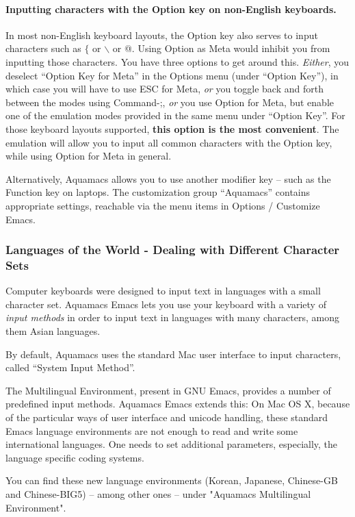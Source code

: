 \documentclass[11pt,letterpaper]{article}
\begin{document}
\paragraph{Inputting characters with the Option key on non-English
  keyboards.} In most non-English keyboard layouts, the Option key
also serves to input characters such as $\{$ or $\backslash$ or
@. Using Option as Meta would inhibit you from inputting those
characters. You have three options to get around this. \emph{Either},
you deselect ``Option Key for Meta'' in the Options menu (under
``Option Key''), in which case you will have to use ESC for Meta,
\emph{or} you toggle back and forth between the modes using Command-;,
\emph{or} you use Option for Meta, but enable one of the emulation
modes provided in the same menu under ``Option Key''.  For those keyboard layouts supported, \textbf{this option is the most convenient}.  The emulation will allow
you to input all common characters with the Option key, while using Option for Meta in general. 

Alternatively, Aquamacs allows you to use another modifier key -- such
as the Function key on laptops. The customization group ``Aquamacs''
contains appropriate settings, reachable via the menu items in Options / Customize Emacs.

\subsubsection{Languages of the World - Dealing with Different Character Sets}

Computer keyboards were designed to input text in languages with a
small character set.  Aquamacs Emacs lets you use your keyboard with a
variety of \emph{ input methods } in order to input text in languages
with many characters, among them Asian languages.
 
By default, Aquamacs uses the standard Mac user interface to input
characters, called ``System Input Method''.

The Multilingual Environment, present in GNU Emacs, provides a number
of predefined input methods.  Aquamacs Emacs extends this: On Mac OS
X, because of the particular ways of user interface and unicode
handling, these standard Emacs language environments are not enough to
read and write some international languages.  One needs to set
additional parameters, especially, the language specific coding
systems.
 
You can find these new language environments (Korean, Japanese,
Chinese-GB and Chinese-BIG5) -- among other ones -- under "Aquamacs
Multilingual Environment". 
\end{document}
